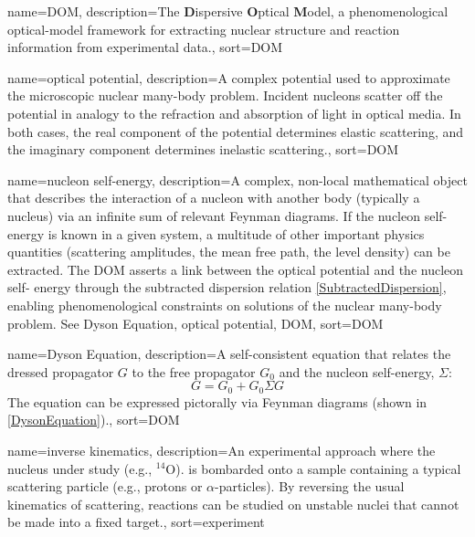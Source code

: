 \makeglossaries

{
    name={DOM},
    description={The \textbf{D}ispersive \textbf{O}ptical \textbf{M}odel, a phenomenological optical-model framework for extracting nuclear structure and reaction information from experimental data.},
    sort={DOM}
}

{
    name={optical potential},
    description={A complex potential used to approximate the microscopic nuclear many-body problem. Incident nucleons scatter off the potential in analogy to the refraction and absorption of light in optical media.  In both cases, the real component of the potential determines elastic scattering, and the imaginary component determines inelastic scattering.},
    sort={DOM}
}

{
    name={nucleon self-energy},
    description={A complex, non-local mathematical object that describes the interaction of a
        nucleon with another body (typically a nucleus) via an infinite sum of relevant Feynman 
        diagrams. If the nucleon self-energy is known in a given system, a multitude of other 
        important physics quantities (scattering amplitudes, the mean free path, the level density) 
        can be extracted. The DOM asserts a link between the optical potential and the nucleon self-
        energy through the subtracted dispersion relation \ref{SubtractedDispersion}, enabling 
        phenomenological constraints on solutions of the nuclear many-body 
        problem. See \Gls{Dyson Equation}, \Gls{optical potential}, \Gls{DOM}},
    sort={DOM}
}

{
    name={Dyson Equation},
    description={A self-consistent equation that relates the dressed propagator $G$ to the free
        propagator $G_{0}$ and the \Gls{nucleon self-energy}, $\Sigma$:
        \begin{equation}
            G = G_{0} + G_{0} \Sigma G
        \end{equation}
        The equation can be expressed pictorally via Feynman diagrams (shown in
        \ref{DysonEquation}).},
    sort={DOM}
}

{
    name={inverse kinematics},
    description={An experimental approach where the nucleus under study
        (e.g., $^{14}$O). is bombarded onto a sample containing a typical
        scattering particle (e.g., protons or $\alpha$-particles).
        By reversing the usual kinematics of scattering,
        reactions can be studied on unstable nuclei that
    cannot be made into a fixed target.},
    sort={experiment}
}

